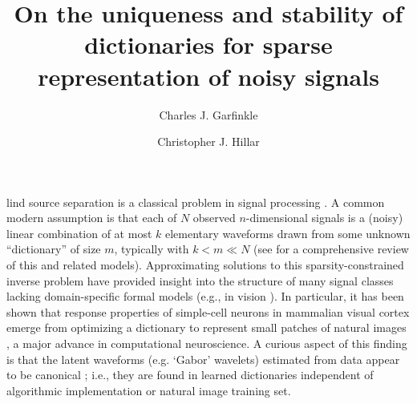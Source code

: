 \documentclass[9pt,twocolumn]{pnas-new}
\title{On the uniqueness and stability of dictionaries for sparse representation of noisy signals}
\author[a,1]{Charles J. Garfinkle}
\author[a,1]{Christopher J. Hillar}
\affil[a]{Redwood Center for Theoretical Neuroscience, Berkeley, CA, USA}
\begin{document}
\verticaladjustment{-2pt}

\maketitle
\thispagestyle{firststyle}

lind source separation is a classical problem in signal processing \cite{sato1975method}.
A common modern assumption is that each of $N$ observed $n$-dimensional signals is a (noisy) linear combination of at most $k$ elementary waveforms drawn from some unknown ``dictionary'' of size $m$, typically with $k < m \ll N$ (see \cite{Zhang15} for a comprehensive review of this and related models).
Approximating solutions to this sparsity-constrained inverse problem have provided insight into the structure of many signal classes lacking domain-specific formal models (e.g., in vision \cite{wang2015sparse}).  In particular, it has been shown that response properties of simple-cell neurons in mammalian visual cortex emerge from optimizing a dictionary to represent small patches of natural images \cite{Olshausen96, hurri1996image, bell1997independent, van1998independent}, a major advance in computational neuroscience. A curious aspect of this finding is that the latent waveforms (e.g. `Gabor' wavelets) estimated from data appear to be canonical \cite{donoho2001can};
i.e., they are found in learned dictionaries independent of algorithmic implementation or natural image training set.

\end{document}
